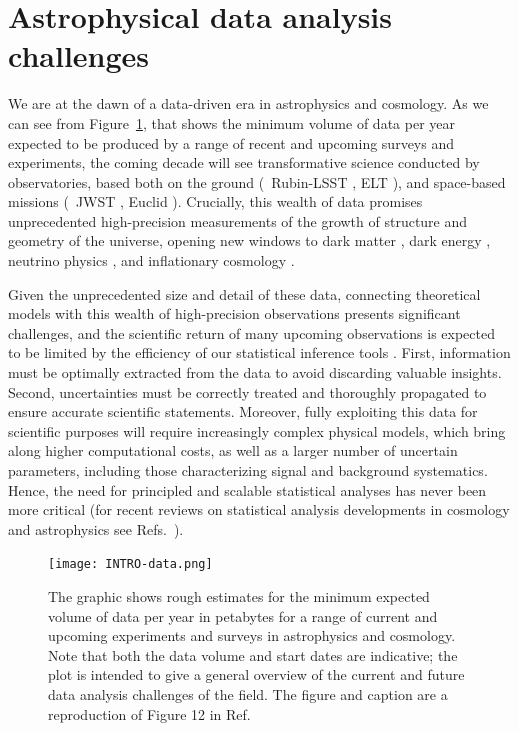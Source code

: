 \section{Astrophysical data analysis challenges}\label{sec:astro}

We are at the dawn of a data-driven era in astrophysics and cosmology. As we can see from Figure~\ref{fig:intro-data}, that shows the minimum volume of data per year expected to be produced by a range of recent and upcoming surveys and experiments, the coming decade will see transformative science conducted by observatories, based both on the ground (\eg\ Rubin-LSST \cite{LSSTDarkEnergyScience:2012kar}, ELT \cite{Simon:2019aa}), and space-based missions (\eg\ JWST \citep{Gardner:2006ky}, Euclid \cite{Refregier:2010ss}). Crucially, this wealth of data promises unprecedented high-precision measurements of the growth of structure and geometry of the universe, opening new windows to dark matter \cite{Cirelli:2024ssz, drlicawagner2022reporttopicalgroupcosmic}, dark energy \cite{Mortonson:2013zfa, Huterer:2017buf}, neutrino physics \cite{Boyarsky:2012rt, SajjadAthar:2021prg}, and inflationary cosmology \cite{Baumann:2009ds, Achucarro:2022qrl}.

Given the unprecedented size and detail of these data, connecting theoretical models with this wealth of high-precision observations presents significant challenges, and the scientific return of many upcoming observations is expected to be limited by the efficiency of our statistical inference tools \cite{AlvesBatista:2021eeu, Green:2022hhj}. First, information must be optimally extracted from the data to avoid discarding valuable insights. Second, uncertainties must be correctly treated and thoroughly propagated to ensure accurate scientific statements. Moreover, fully exploiting this data for scientific purposes will require increasingly complex physical models, which bring along higher computational costs, as well as a larger number of uncertain parameters, including those characterizing signal and background systematics. Hence, the need for principled and scalable statistical analyses has never been more critical (for recent reviews on statistical analysis developments in cosmology and astrophysics see Refs.~\cite{Trotta:2017wnx, verde2010statistical, feigelson2021twenty}).

\begin{figure}
    \centering
	\texttt{[image: INTRO-data.png]}
    \caption{The graphic shows rough estimates for the minimum expected volume of data per year in petabytes for a range of current and upcoming experiments and surveys in astrophysics and cosmology. Note that both the data volume and start dates are indicative; the plot is intended to give a general overview of the current and future data analysis challenges of the field. The figure and caption are a reproduction of Figure 12 in Ref.~\cite{AlvesBatista:2021eeu}}
    \label{fig:intro-data}
\end{figure}

